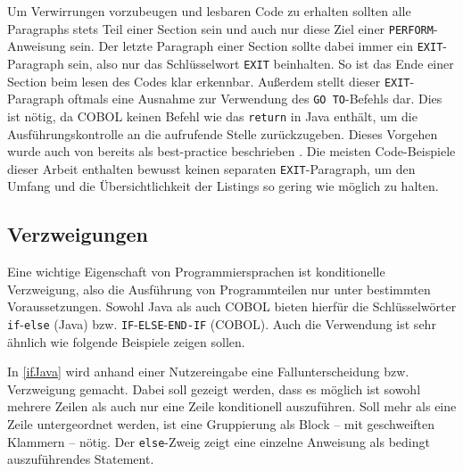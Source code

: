 Um Verwirrungen vorzubeugen und lesbaren Code zu erhalten sollten alle Paragraphs stets Teil einer Section sein und auch nur diese Ziel einer \texttt{PERFORM}-Anweisung sein. Der letzte Paragraph einer Section sollte dabei immer ein \texttt{EXIT}-Paragraph sein, also nur das Schlüsselwort \texttt{EXIT} beinhalten. So ist das Ende einer Section beim lesen des Codes klar erkennbar. Außerdem stellt dieser \texttt{EXIT}-Paragraph oftmals eine Ausnahme zur Verwendung des \texttt{GO TO}-Befehls dar. Dies ist nötig, da COBOL keinen Befehl wie das \texttt{return} in Java enthält, um die Ausführungskontrolle an die aufrufende Stelle zurückzugeben. Dieses Vorgehen wurde auch von \citeauthor{richards_enhancing_1984} bereits \citeyear{richards_enhancing_1984} als best-practice beschrieben  \cite{richards_enhancing_1984}. Die meisten Code-Beispiele dieser Arbeit enthalten bewusst keinen separaten \texttt{EXIT}-Paragraph, um den Umfang und die Übersichtlichkeit der Listings so gering wie möglich zu halten. 

\subsection{Verzweigungen}
Eine wichtige Eigenschaft von Programmiersprachen ist konditionelle Verzweigung, also die Ausführung von Programmteilen nur unter bestimmten Voraussetzungen. Sowohl Java als auch COBOL bieten hierfür die Schlüsselwörter \texttt{if}-\texttt{else} (Java) bzw. \texttt{IF}-\texttt{ELSE}-\texttt{END-IF} (COBOL). Auch die Verwendung ist sehr ähnlich wie folgende Beispiele zeigen sollen.


In \autoref{ifJava} wird anhand einer Nutzereingabe eine Fallunterscheidung bzw. Verzweigung gemacht. Dabei soll gezeigt werden, dass es möglich ist sowohl mehrere Zeilen als auch nur eine Zeile konditionell auszuführen. Soll mehr als eine Zeile untergeordnet werden, ist eine Gruppierung als Block -- mit geschweiften Klammern -- nötig. Der \texttt{else}-Zweig zeigt eine einzelne Anweisung als bedingt auszuführendes Statement.


